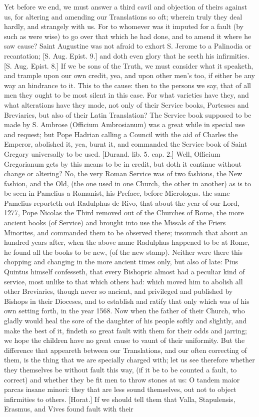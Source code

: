 {\par }{\IP Yet before we end, we must answer a third cavil and objection of theirs against us, for altering and amending our Translations so oft; wherein truly they deal hardly, and strangely with us. For to whomever was it imputed for a fault (by such as were wise) to go over that which he had done, and to amend it where he saw cause? Saint Augustine was not afraid to exhort S. Jerome to a Palinodia or recantation; [S. Aug. Epist. 9.] and doth even glory that he seeth his infirmities. [S. Aug. Epist. 8.] If we be sons of the Truth, we must consider what it speaketh, and trample upon our own credit, yea, and upon other men’s too, if either be any way an hindrance to it. This to the cause: then to the persons we say, that of all men they ought to be most silent in this case. For what varieties have they, and what alterations have they made, not only of their Service books, Portesses and Breviaries, but also of their Latin Translation? The Service book supposed to be made by S. Ambrose (Officium Ambrosianum) was a great while in special use and request; but Pope Hadrian calling a Council with the aid of Charles the Emperor, abolished it, yea, burnt it, and commanded the Service book of Saint Gregory universally to be used. [Durand. lib. 5. cap. 2.] Well, Officium Gregorianum gets by this means to be in credit, but doth it continue without change or altering? No, the very Roman Service was of two fashions, the New fashion, and the Old, (the one used in one Church, the other in another) as is to be seen in Pamelius a Romanist, his Preface, before Micrologus. the same Pamelius reporteth out Radulphus de Rivo, that about the year of our Lord, 1277, Pope Nicolas the Third removed out of the Churches of Rome, the more ancient books (of Service) and brought into use the Missals of the Friers Minorites, and commanded them to be observed there; insomuch that about an hundred years after, when the above name Radulphus happened to be at Rome, he found all the books to be new, (of the new stamp). Neither were there this chopping and changing in the more ancient times only, but also of late: Pius Quintus himself confesseth, that every Bishopric almost had a peculiar kind of service, most unlike to that which others had: which moved him to abolish all other Breviaries, though never so ancient, and privileged and published by Bishops in their Dioceses, and to establish and ratify that only which was of his own setting forth, in the year 1568. Now when the father of their Church, who gladly would heal the sore of the daughter of his people softly and slightly, and make the best of it, findeth so great fault with them for their odds and jarring; we hope the children have no great cause to vaunt of their uniformity. But the difference that appeareth between our Translations, and our often correcting of them, is the thing that we are specially charged with; let us see therefore whether they themselves be without fault this way, (if it be to be counted a fault, to correct) and whether they be fit men to throw stones at us: O tandem maior parcas insane minori: they that are less sound themselves, out not to object infirmities to others. [Horat.] If we should tell them that Valla, Stapulensis, Erasmus, and Vives found fault with their }

